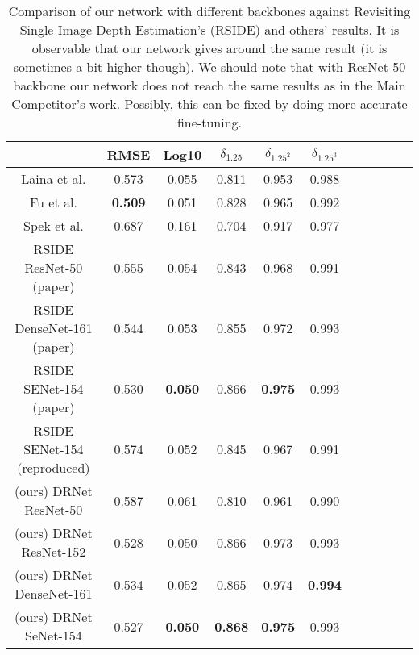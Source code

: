 \documentclass[10pt,twocolumn,letterpaper]{article}
\begin{document}
\begin{table*}
    \begin{center}
    \begin{tabular}{ccccccccccc}
    \hline
    & RMSE & Log10 & $\delta_{1.25}$ & $\delta_{1.25 ^ 2}$ & $\delta_{1.25^3}$  \\
    \hline
\hline

\hline

Laina et al. \cite{laina2016deeper} & 0.573 & 0.055 & 0.811 & 0.953 & 0.988 \\
Fu et al. \cite{fu2018deep} & \textbf{0.509} & 0.051 & 0.828 & 0.965 & 0.992 \\
Spek et al. \cite{spek2018cream} & 0.687 & 0.161 & 0.704 & 0.917 & 0.977 \\
RSIDE ResNet-50 (paper) & 0.555 & 0.054 & 0.843 & 0.968 & 0.991 \\
RSIDE DenseNet-161 (paper) & 0.544 & 0.053 & 0.855 & 0.972 & 0.993 \\
RSIDE SENet-154 (paper) & 0.530 & \textbf{0.050} & 0.866 & \textbf{0.975} & 0.993 \\
RSIDE SENet-154 (reproduced) & 0.574 & 0.052 & 0.845 & 0.967 & 0.991 \\

\hline
(ours) DRNet ResNet-50  & 0.587 & 0.061 & 0.810 & 0.961 & 0.990 \\
(ours) DRNet ResNet-152 & 0.528 & 0.050 & 0.866 & 0.973 & 0.993 \\
(ours) DRNet DenseNet-161 & 0.534 & 0.052 & 0.865 & 0.974 & \textbf{0.994} \\
(ours) DRNet SeNet-154 & 0.527 & \textbf{0.050} & \textbf{0.868} & \textbf{0.975} & 0.993 \\
\hline
\end{tabular}
\end{center}
\caption{Comparison of our network with different backbones against
Revisiting Single Image Depth Estimation's (RSIDE) \cite{hu2018revisiting} and others' results. 
It is observable that our network gives around the same result 
(it is sometimes a bit higher though). We should note that with ResNet-50 backbone our network 
does not reach the same results as in the Main Competitor's work. 
Possibly, this can be fixed by doing more accurate fine-tuning.}
\label{fig:table_of_results}
\end{table*}
\end{document}
